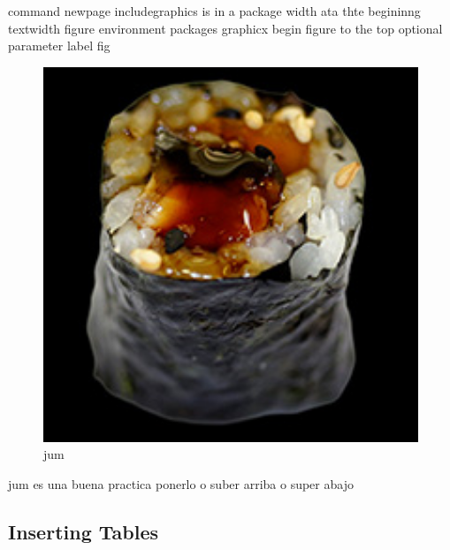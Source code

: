 \documentclass{article}
\begin{document}
	command
	newpage
	includegraphics is in a package width ata thte begininng
	textwidth
	figure environment
	packages
		graphicx
	begin figure to the top optional parameter
	label fig
	
	\begin{figure}
	\includegraphics[width=1\textwidth]{makis}
	\caption{jum}\label{fig:first-figure}
	\end{figure}
	jum
	es una buena practica ponerlo o suber arriba o super abajo
	
	\subsection{Inserting Tables}
	
\end{document}
